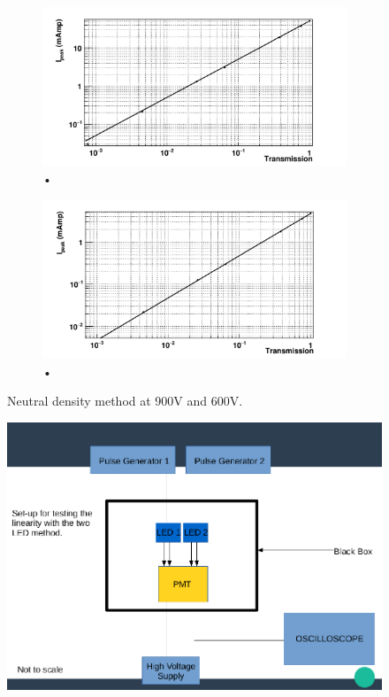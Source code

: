 \begin{figure}
\centering
\begin{subfigure}[b]{\textwidth}
\includegraphics[width=\textwidth]{chapters/graphs/PMTchar/PMT900V_linearityNDmethod.pdf}
\caption{•}
\end{subfigure}
\begin{subfigure}[b]{\textwidth}
\includegraphics[width=\textwidth]{chapters/graphs/PMTchar/PMT600V_linearityNDmethod.pdf}
\caption{•}
\end{subfigure}
\caption{Neutral density method at 900V and 600V.}
\end{figure}

\begin{figure}
\centering
\includegraphics[width=\textwidth]{chapters/graphs/PMTchar/diagram_TwoLEDmethod.pdf}
\end{figure}


